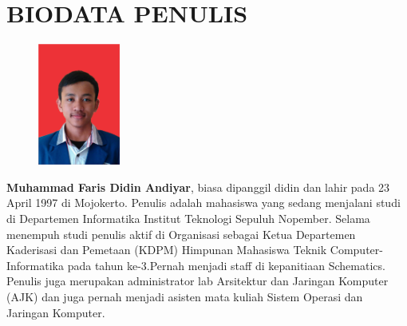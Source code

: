 \documentclass[12pt,oneside,reqno]{ta-its}
\begin{document}
	\frontmatter %
	\maketitle
	\legalityPaper %
	
    
	

	\cleardoublepage %

	\tableofcontents %
	\listoftables %
	\listoffigures %
	\lstlistoflistings %

	\mainmatter
	
	
	
	
	
	
	
%	


	
    
    \renewcommand\chaptername{LAMPIRAN}
	\appendix
    
    

	\appendix

	\backmatter %
%
	\chapter{BIODATA PENULIS}
	\begin{figure}
		\includegraphics[width=2.7cm,height=4cm]{Images/fotoDiri.png}
	\end{figure}
	
	\textbf{Muhammad Faris Didin Andiyar}, biasa dipanggil didin dan lahir pada 23 April 1997 di Mojokerto. Penulis adalah mahasiswa yang sedang menjalani studi di Departemen Informatika Institut Teknologi Sepuluh Nopember. Selama menempuh studi penulis aktif di Organisasi sebagai Ketua Departemen Kaderisasi dan Pemetaan (KDPM) Himpunan Mahasiswa Teknik Computer-Informatika pada tahun ke-3.Pernah menjadi staff di kepanitiaan Schematics. Penulis juga merupakan administrator lab Arsitektur dan Jaringan Komputer (AJK) dan juga pernah menjadi asisten mata kuliah Sistem Operasi dan Jaringan Komputer.\\
		
\end{document}
